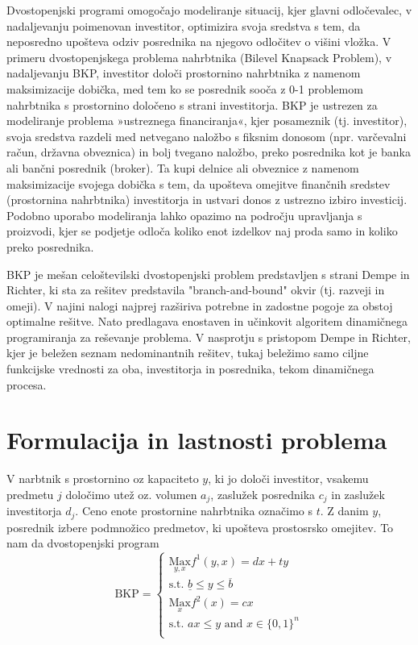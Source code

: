 \documentclass[a4paper, 11pt]{article}
\begin{document}
	Dvostopenjski programi omogočajo modeliranje situacij, kjer glavni odločevalec, v nadaljevanju poimenovan investitor, optimizira svoja sredstva s tem, da neposredno upošteva odziv posrednika na njegovo odločitev o višini vložka. V primeru dvostopenjskega problema nahrbtnika (Bilevel Knapsack Problem), v nadaljevanju BKP, investitor določi prostornino nahrbtnika z namenom maksimizacije dobička, med tem ko se posrednik sooča z 0-1 problemom nahrbtnika s prostornino določeno s strani investitorja. BKP je ustrezen za modeliranje problema »ustreznega financiranja«, kjer posameznik (tj. investitor), svoja sredstva razdeli med netvegano naložbo s fiksnim donosom (npr. varčevalni račun, državna obveznica) in bolj tvegano naložbo, preko posrednika kot je banka ali bančni posrednik (broker). Ta kupi delnice ali obveznice z namenom maksimizacije svojega dobička s tem, da upošteva omejitve finančnih sredstev (prostornina nahrbtnika) investitorja in ustvari donos z ustrezno izbiro investicij. Podobno uporabo modeliranja lahko opazimo na področju upravljanja s proizvodi, kjer se podjetje odloča koliko enot izdelkov naj proda samo in koliko preko posrednika.
	
	BKP je mešan celoštevilski dvostopenjski problem predstavljen s strani Dempe in Richter, ki sta za rešitev predstavila "branch-and-bound" okvir (tj. razveji in omeji). V najini nalogi najprej razširiva potrebne in zadostne pogoje za obstoj optimalne rešitve. Nato predlagava enostaven in učinkovit algoritem dinamičnega programiranja za reševanje problema. V nasprotju s pristopom Dempe in Richter, kjer je beležen seznam nedominantnih rešitev, tukaj beležimo samo ciljne funkcijske vrednosti za oba, investitorja in posrednika, tekom dinamičnega procesa.
		
	\section{Formulacija in lastnosti problema}
	
	V narbtnik s prostornino oz kapaciteto $y$, ki jo določi investitor, vsakemu predmetu $j$ določimo utež oz. volumen $a_j$, zaslužek posrednika $c_j$ in zaslužek investitorja $d_j$. Ceno enote prostornine nahrbtnika označimo s $t$. Z danim $y$, posrednik izbere podmnožico predmetov, ki upošteva prostosrsko omejitev. To nam da dvostopenjski program
	\[   
	\text{BKP} = 
    	\begin{cases}
	 	\text{$\underset{y,x}{\text{Max}} f^{1}(y,x)=dx+ty$} \\
       		\text{s.t. $\underline{b} \leq y \leq \overline{b}$} \\
       		\text{$\underset{x}{\text{Max}} f^{2}(x)=cx$} \\
       		\text{s.t. $ax \leq y$ and $x \in \{ 0, 1\}^n$} \\ 
    	\end{cases}
	\]
\end{document}
